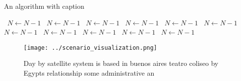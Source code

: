\documentclass[a4paper]{article}
\begin{document}
\begin{algorithm}
\caption{An algorithm with caption}
\begin{algorithmic}
\    \State $N \gets N - 1$
\    \State $N \gets N - 1$
\    \State $N \gets N - 1$
\    \State $N \gets N - 1$
\    \State $N \gets N - 1$
\    \State $N \gets N - 1$
\    \State $N \gets N - 1$
\    \State $N \gets N - 1$
\    \State $N \gets N - 1$
\    \State $N \gets N - 1$
\    \State $N \gets N - 1$
\EndWhile
\end{algorithmic}
\end{algorithm}

\begin{figure}
\centering
\texttt{[image: ../scenario\_visualization.png]}
\caption{Day by satellite system is based in buenos aires teatro coliseo by Egypts relationship some administrative an
}
\end{figure}
 
\end{document}
